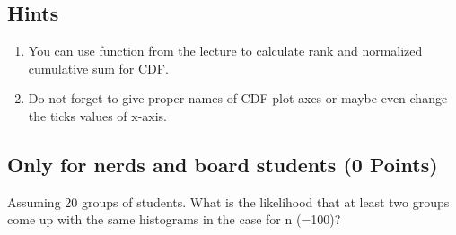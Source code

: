 \documentclass{WeSTassignment}
\begin{document}
\subsection{Hints}
\begin{enumerate}
\item You can use function from the lecture to calculate rank and normalized cumulative sum for CDF.
\item Do not forget to give proper names of CDF plot axes or maybe even change the ticks values of x-axis. 
\end{enumerate}

\subsection{Only for nerds and board students (0 Points)}
Assuming 20 groups of students. What is the likelihood that at least two groups come up with the same histograms in the case for n (=100)?





\makefooter
\end{document}
